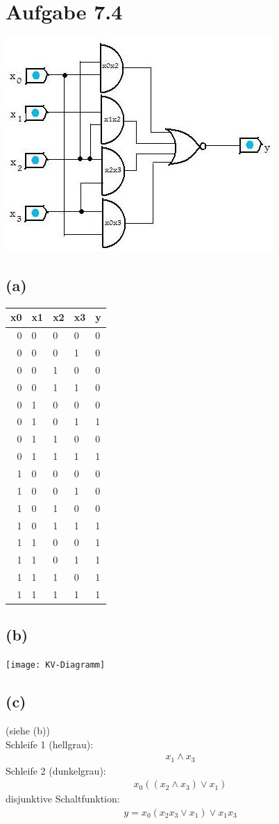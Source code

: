 \documentclass[12pt]{article}
\begin{document}
\section{Aufgabe 7.4}
\includegraphics{Schaltnetz}
\subsection{(a)}
\begin{tabular} {rlll|l}
x0 & x1 & x2 & x3 & y \\ \hline 
0 & 0 & 0 & 0 & 0 \\
0 & 0 & 0 & 1 & 0 \\
0 & 0 & 1 & 0 & 0 \\
0 & 0 & 1 & 1 & 0 \\
0 & 1 & 0 & 0 & 0 \\
0 & 1 & 0 & 1 & 1 \\
0 & 1 & 1 & 0 & 0 \\
0 & 1 & 1 & 1 & 1 \\
1 & 0 & 0 & 0 & 0 \\
1 & 0 & 0 & 1 & 0 \\
1 & 0 & 1 & 0 & 0 \\
1 & 0 & 1 & 1 & 1 \\
1 & 1 & 0 & 0 & 1 \\
1 & 1 & 0 & 1 & 1 \\
1 & 1 & 1 & 0 & 1 \\
1 & 1 & 1 & 1 & 1
\end{tabular}

\subsection{(b)}
\texttt{[image: KV-Diagramm]}

\subsection{(c)}
(siehe (b))\\
Schleife 1 (hellgrau):
\begin{align}
x_1 \land x_3
\end{align}
Schleife 2 (dunkelgrau):
\begin{align}
x_0((x_2 \land x_3) \lor x_1)
\end{align}
disjunktive Schaltfunktion:
\begin{align}
y = x_0 (x_2 x_3 \lor x_1) \lor x_1 x_3
\end{align}
\end{document}
